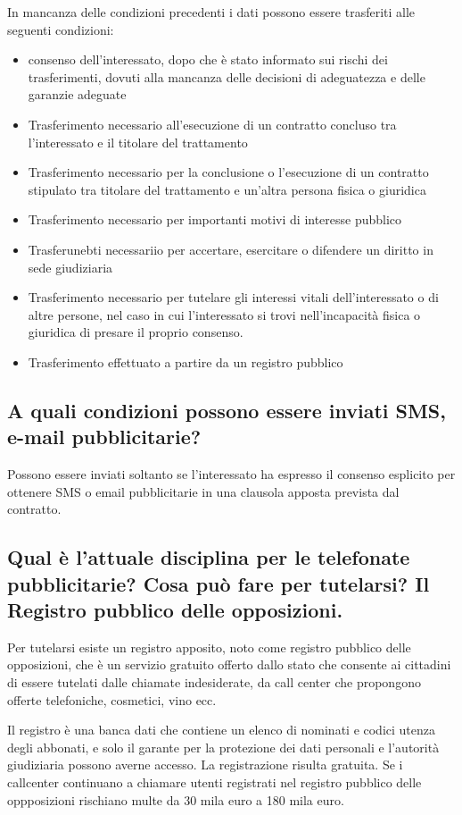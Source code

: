 In mancanza delle condizioni precedenti i dati possono essere trasferiti alle seguenti condizioni:
\begin{itemize}
    \item consenso dell'interessato, dopo che è stato informato sui rischi dei trasferimenti, dovuti alla mancanza delle decisioni di adeguatezza e delle garanzie adeguate
    \item Trasferimento necessario all'esecuzione di un contratto concluso tra l'interessato e il titolare del trattamento
    \item Trasferimento necessario per la conclusione o l'esecuzione di un contratto stipulato tra titolare del trattamento e un'altra persona fisica o giuridica
    \item Trasferimento necessario per importanti motivi di interesse pubblico
    \item Trasferunebti necessariio per accertare, esercitare o difendere un diritto in sede giudiziaria
    \item Trasferimento necessario per tutelare gli interessi vitali dell'interessato o di altre persone, nel caso in cui l'interessato si trovi nell'incapacità fisica o giuridica di presare il proprio consenso.
    \item Trasferimento effettuato a partire da un registro pubblico
\end{itemize}
\subsection{A quali condizioni possono essere inviati SMS, e-mail pubblicitarie?}
Possono essere inviati soltanto se l'interessato ha espresso il consenso esplicito per ottenere SMS o email pubblicitarie in una clausola apposta prevista dal contratto.

\subsection{Qual è l'attuale disciplina per le telefonate pubblicitarie? Cosa può fare per tutelarsi? Il Registro
pubblico delle opposizioni.}

Per tutelarsi esiste un registro apposito, noto come registro pubblico delle opposizioni, che è un servizio gratuito offerto dallo stato che consente ai cittadini di essere tutelati dalle chiamate indesiderate, da call center che propongono offerte telefoniche, cosmetici, vino ecc.

Il registro è una banca dati che contiene un elenco di nominati e codici utenza degli abbonati, e solo il garante per la protezione dei dati personali e l'autorità giudiziaria possono averne accesso.
La registrazione risulta gratuita. Se i callcenter continuano a chiamare utenti registrati nel registro pubblico delle oppposizioni rischiano multe da 30 mila euro a 180 mila euro.

